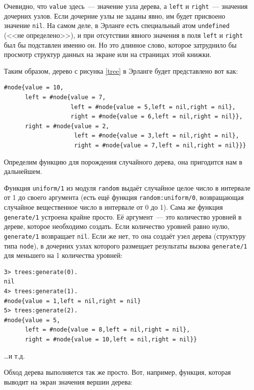 \documentclass[
  paper=a4,
  fontsize=14pt,
  openany,
  appendixprefix=true
]{scrbook}
\begin{document}


Очевидно, что \lstinline{value} здесь~--- значение узла дерева, а \lstinline{left} и \lstinline{right}~--- значения дочерних узлов. Если дочерние узлы не заданы явно, им будет присвоено значение \lstinline{nil}. На самом деле, в Эрланге есть специальный атом \lstinline{undefined} (<<не определено>>), и при отсутствии явного значения в поля \lstinline{left} и \lstinline{right} был бы подставлен именно он. Но это длинное слово, которое затруднило бы просмотр структур данных на экране или на страницах этой книжки.

Таким образом, дерево с рисунка \ref{tree} в Эрланге будет представлено вот как:
\begin{verbatim}
#node{value = 10,
      left = #node{value = 7,
                   left = #node{value = 5,left = nil,right = nil},
                   right = #node{value = 6,left = nil,right = nil}},
      right = #node{value = 2,
                    left = #node{value = 3,left = nil,right = nil},
                    right = #node{value = 7,left = nil,right = nil}}}
\end{verbatim}

Определим функцию для порождения случайного дерева, она пригодится нам в дальнейшем.



Функция \lstinline{uniform/1} из модуля \lstinline{random} выдаёт случайное целое число в интервале от 1 до своего аргумента (есть ещё функция \lstinline{random:uniform/0}, возвращающая случайное вещественное число в интервале от 0 до 1). Сама же функция \lstinline{generate/1} устроена крайне просто. Её аргумент~--- это количество уровней в дереве, которое необходимо создать. Если количество уровней равно нулю, \lstinline{generate/1} возвращает \lstinline{nil}. Если же нет, то она создаёт узел дерева (структуру типа \lstinline{node}), в дочерних узлах которого размещает результаты вызова \lstinline{generate/1} для меньшего на 1 количества уровней:

\begin{verbatim}
3> trees:generate(0).
nil
4> trees:generate(1).
#node{value = 1,left = nil,right = nil}
5> trees:generate(2).
#node{value = 5,
      left = #node{value = 8,left = nil,right = nil},
      right = #node{value = 10,left = nil,right = nil}}
\end{verbatim}
\ldots{}и т.д.

Обход дерева выполняется так же просто. Вот, например, функция, которая выводит на экран значения вершин дерева:
\end{document}
